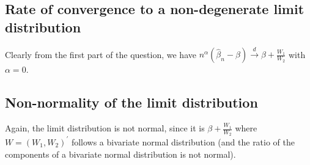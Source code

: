 \subsection{Rate of convergence to a non-degenerate limit distribution}

Clearly from the first part of the question, we have \(n^{\alpha} \left(
\widehat{\beta}_{n} - \beta \right) \overset{d}{\to} \beta +
\frac{W_{1}}{W_{2}}\) with \(\alpha = 0\).

\subsection{Non-normality of the limit distribution}

Again, the limit distribution is not normal, since it is \(\beta +
\frac{W_{1}}{W_{2}}\) where \(W = \left( W_{1}, W_{2} \right)^{\prime}\) follows
a bivariate normal distribution (and the ratio of the components of a bivariate
normal distribution is not normal).
